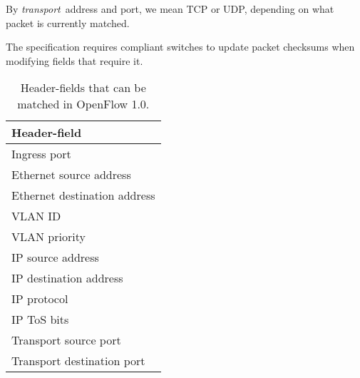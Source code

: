 By \textit{transport} address and port, we mean \ac{TCP} or \ac{UDP},
depending on what packet is currently matched.

The specification requires compliant switches to update packet checksums
when modifying fields that require it.

\begin{table}
  \centering
  \begin{tabular}{l}
    \hline
     \textbf{Header-field} \\
    \hline
     Ingress port\index{OpenFlow!match on ingress port} \\

     Ethernet source address\index{OpenFlow!match on Ethernet} \\
     Ethernet destination address\index{OpenFlow!match on Ethernet} \\

     VLAN ID\index{OpenFlow!match on VLAN} \\
     VLAN priority\index{OpenFlow!match on VLAN} \\

     IP source address\index{OpenFlow!match on IP address} \\
     IP destination address\index{OpenFlow!match on IP address} \\
     IP protocol\index{OpenFlow!match on IP protocol} \\
     IP \ac{ToS} bits\index{OpenFlow!match on ToS} \\

     Transport source port\index{OpenFlow!UDP}\index{OpenFlow!TCP}\index{OpenFlow!transport} \\
     Transport destination port \\
    \hline
  \end{tabular}
  \caption{Header-fields that can be matched in OpenFlow 1.0.}
  \label{table:openflow-1.0.headers}
\end{table}

